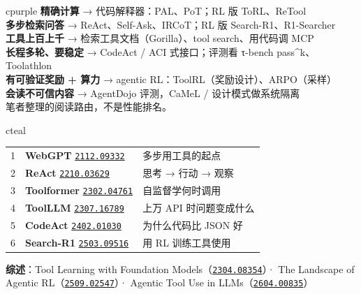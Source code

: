 \documentclass[8pt]{extarticle}
\newcommand{\ax}[1]{\href{https://arxiv.org/abs/#1}{\texttt{#1}}}
\begin{document}
\begin{minipage}[t]{0.435\linewidth}\vspace{0pt}
\begin{tbox}[title={速查：我的场景该参考哪条线？}]{cpurple}\small
\textbf{精确计算} → 代码解释器：PAL、PoT；RL 版 ToRL、ReTool\\
\textbf{多步检索问答} → ReAct、Self-Ask、IRCoT；RL 版 Search-R1、R1-Searcher\\
\textbf{工具上百上千} → 检索工具文档（Gorilla）、tool search、用代码调 MCP\\
\textbf{长程多轮、要稳定} → CodeAct / ACI 式接口；评测看 τ-bench pass\^{}k、Toolathlon\\
\textbf{有可验证奖励 + 算力} → agentic RL：ToolRL（奖励设计）、ARPO（采样）\\
\textbf{会读不可信内容} → AgentDojo 评测，CaMeL / 设计模式做系统隔离\\[1pt]
{\scriptsize\color{cgray}笔者整理的阅读路由，不是性能排名。}
\end{tbox}
\begin{tbox}[title={入门必读 6 篇（按顺序）}]{cteal}\small
\begin{tabularx}{\linewidth}{@{}l l Y@{}}
1 & \textbf{WebGPT} \ax{2112.09332} & 多步用工具的起点\\
2 & \textbf{ReAct} \ax{2210.03629} & 思考 → 行动 → 观察\\
3 & \textbf{Toolformer} \ax{2302.04761} & 自监督学何时调用\\
4 & \textbf{ToolLLM} \ax{2307.16789} & 上万 API 时问题变成什么\\
5 & \textbf{CodeAct} \ax{2402.01030} & 为什么代码比 JSON 好\\
6 & \textbf{Search-R1} \ax{2503.09516} & 用 RL 训练工具使用\\
\end{tabularx}
\textbf{综述}：Tool Learning with Foundation Models（\ax{2304.08354}）· The Landscape of Agentic RL（\ax{2509.02547}）· Agentic Tool Use in LLMs（\ax{2604.00835}）
\end{tbox}
\end{minipage}
\end{document}
